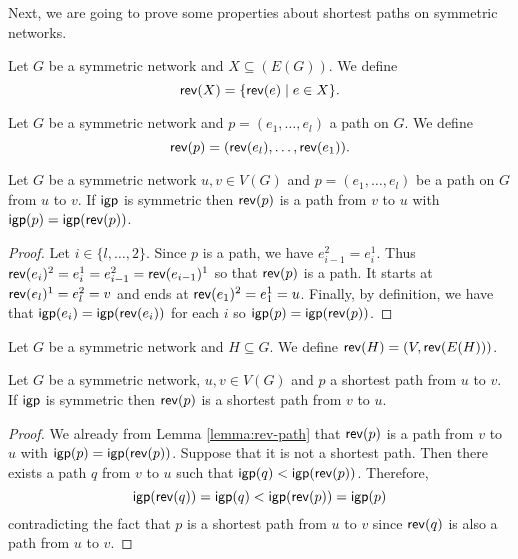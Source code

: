 Next, we are going to prove some properties about shortest paths on symmetric networks.

\begin{definition}
Let $G$ be a symmetric network and $X \subseteq(E(G))$. We define
$$
\mathsf{rev}(X) = \{ \mathsf{rev}(e) \mid e \in X \}.
$$
\end{definition}

\begin{definition}
Let $G$ be a symmetric network and $p = (e_1, \ldots, e_l)$ a path on $G$. We define
$$
\mathsf{rev}(p) = ( \mathsf{rev}(e_l), \ldots, \mathsf{rev}(e_1) ).
$$
\end{definition}

\begin{lemma}
\label{lemma:rev-path}
Let $G$ be a symmetric network $u, v \in V(G)$ and $p = (e_1, \ldots, e_l)$ be a path on $G$ from $u$ to $v$.
If $\mathsf{igp}$ is symmetric then $\mathsf{rev}(p)$ is a path from $v$ to $u$ with $\mathsf{igp}(p) = \mathsf{igp}(\mathsf{rev}(p))$.
\end{lemma}

\begin{proof}
Let $i \in \{l, \ldots, 2\}$. Since $p$ is a path, we have $e^2_{i - 1} = e^1_{i}$. Thus
$\mathsf{rev}(e_i)^2 = e^1_i = e^2_{i - 1}  = \mathsf{rev}(e_{i - 1})^1$ so that $\mathsf{rev}(p)$ is a path.
It starts at $\mathsf{rev}(e_l)^1 = e^2_l = v$ and ends at $\mathsf{rev}(e_1)^2 = e^1_1 = u$. Finally,
by definition, we have that $\mathsf{igp}(e_i) = \mathsf{igp}(\mathsf{rev}(e_i))$ for each $i$ so $\mathsf{igp}(p) = \mathsf{igp}(\mathsf{rev}(p))$.
\end{proof}

\begin{definition}
Let $G$ be  a symmetric network and $H \subseteq G$. We define $\mathsf{rev}(H) = (V, \mathsf{rev}(E(H)))$.
\end{definition}

\begin{lemma}
\label{lemma:sp-reverse}
Let $G$ be a symmetric network, $u, v \in V(G)$ and $p$ a shortest path from $u$ to $v$.
If $\mathsf{igp}$ is symmetric then $\mathsf{rev}(p)$ is a shortest path from $v$ to $u$.
\end{lemma}

\begin{proof}
We already from Lemma \ref{lemma:rev-path} that $\mathsf{rev}(p)$ is a path from $v$ to $u$ with $\mathsf{igp}(p) = \mathsf{igp}(\mathsf{rev}(p))$.
Suppose that it is not a shortest path. Then there exists a path $q$ from $v$ to $u$ such that $\mathsf{igp}(q) < \mathsf{igp}(\mathsf{rev}(p))$. Therefore,
$$
\mathsf{igp}(\mathsf{rev}(q)) = \mathsf{igp}(q) < \mathsf{igp}(\mathsf{rev}(p)) = \mathsf{igp}(p)
$$
contradicting the fact that $p$ is a shortest path from $u$ to $v$ since $\mathsf{rev}(q)$ is also a path from $u$ to $v$.
\end{proof}

